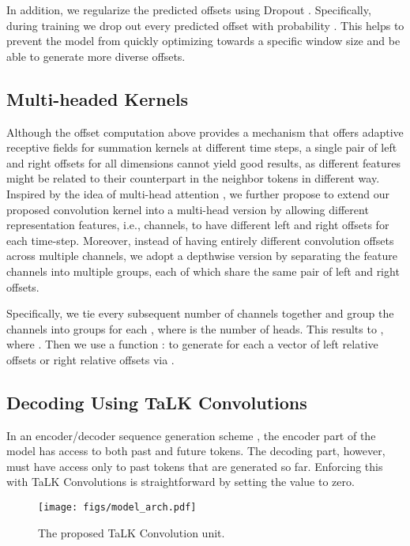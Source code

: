 \documentclass{article}
\def\talkconvfull{TaLK Convolution}
\def\talkconvfulls{TaLK Convolutions}
\begin{document}
In addition, we regularize the predicted offsets  using Dropout \cite{DBLP:journals/corr/abs-1207-0580,JMLR:v15:srivastava14a}. Specifically, during training we drop out every predicted offset with probability . This helps to prevent the model from quickly optimizing towards a specific window size and be able to generate more diverse offsets.

\subsection{Multi-headed Kernels}
\label{sec:mhk}

Although the offset computation above provides a mechanism that offers adaptive receptive fields for summation kernels at different time steps, a single pair of left and right offsets for all  dimensions cannot yield good results, as different features might be related to their counterpart in the neighbor tokens in different way. Inspired by the idea of multi-head attention \cite{vaswani2017attention,wu2019pay}, we further propose to extend our proposed convolution kernel into a multi-head version by allowing different representation features, i.e., channels, to have different left and right offsets for each time-step. Moreover, instead of having entirely different convolution offsets across multiple channels, we adopt a depthwise version by separating the feature channels into multiple groups, each of which share the same pair of left and right offsets.

Specifically, we tie every subsequent number of  channels together and group the channels into  groups for each , where  is the number of heads. This results to , where . Then we use a function  :   to generate for each  a vector of  left relative offsets  or right relative offsets   via  .

\subsection{Decoding Using {\talkconvfulls}}
In an encoder/decoder sequence generation scheme \cite{DBLP:journals/corr/SutskeverVL14}, the encoder part of the model has access to both past and future tokens. The decoding part, however, must have access only to past tokens that are generated so far. Enforcing this with {\talkconvfulls} is straightforward by setting the  value to zero.

\begin{figure}[t]
\centering
\texttt{[image: figs/model\_arch.pdf]}
\caption{The proposed \talkconvfull{} unit.}
\label{fig:unit_arch}
\end{figure}
\end{document}
